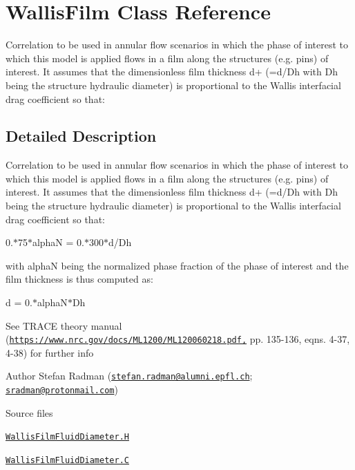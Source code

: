 \hypertarget{classFoam_1_1WallisFilm}{}\section{Wallis\+Film Class Reference}
\label{classFoam_1_1WallisFilm}


Correlation to be used in annular flow scenarios in which the phase of interest to which this model is applied flows in a film along the structures (e.\+g. pins) of interest. It assumes that the dimensionless film thickness d+ (=d/\+Dh with Dh being the structure hydraulic diameter) is proportional to the Wallis interfacial drag coefficient so that\+:  




\subsection{Detailed Description}
Correlation to be used in annular flow scenarios in which the phase of interest to which this model is applied flows in a film along the structures (e.\+g. pins) of interest. It assumes that the dimensionless film thickness d+ (=d/\+Dh with Dh being the structure hydraulic diameter) is proportional to the Wallis interfacial drag coefficient so that\+: 

\label{_Description}%
 0.$\ast$75$\ast$alphaN = 0.$\ast$300$\ast$d/\+Dh

with alphaN being the normalized phase fraction of the phase of interest and the film thickness is thus computed as\+:

d = 0.$\ast$alpha\+N$\ast$\+Dh

See T\+R\+A\+CE theory manual (\href{https://www.nrc.gov/docs/ML1200/ML120060218.pdf,}{\tt https\+://www.\+nrc.\+gov/docs/\+M\+L1200/\+M\+L120060218.\+pdf,} pp. 135-\/136, eqns. 4-\/37, 4-\/38) for further info

Author Stefan Radman (\href{mailto:stefan.radman@alumni.epfl.ch}{\tt stefan.\+radman@alumni.\+epfl.\+ch}; \href{mailto:sradman@protonmail.com}{\tt sradman@protonmail.\+com})

\begin{DoxyParagraph}{Source files}

\begin{DoxyItemize}
\item \href{../../../home/carlo/data/GeN-Foam/GeN-Foam_ffn/GeN-Foam/GeN-Foam/classes/thermalHydraulics/src/physicsModels/fluidDiameterModels/WallisFilm/WallisFilmFluidDiameter.H}{\tt Wallis\+Film\+Fluid\+Diameter.\+H} 
\item \href{../../../home/carlo/data/GeN-Foam/GeN-Foam_ffn/GeN-Foam/GeN-Foam/classes/thermalHydraulics/src/physicsModels/fluidDiameterModels/WallisFilm/WallisFilmFluidDiameter.C}{\tt Wallis\+Film\+Fluid\+Diameter.\+C} 
\end{DoxyItemize}
\end{DoxyParagraph}


